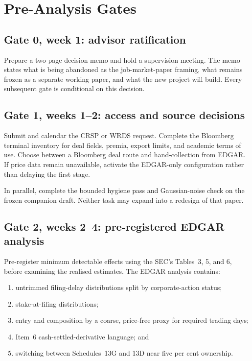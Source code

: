 \section{Pre-Analysis Gates}
\label{sec:plan-gates}

\subsection*{Gate 0, week 1: advisor ratification}

Prepare a two-page decision memo and hold a supervision meeting. The memo states
what is being abandoned as the job-market-paper framing, what remains frozen as
a separate working paper, and what the new project will build. Every subsequent
gate is conditional on this decision.

\subsection*{Gate 1, weeks 1--2: access and source decisions}

Submit and calendar the CRSP or WRDS request. Complete the Bloomberg terminal
inventory for deal fields, premia, export limits, and academic terms of use.
Choose between a Bloomberg deal route and hand-collection from EDGAR. If price
data remain unavailable, activate the EDGAR-only configuration rather than
delaying the first stage.

In parallel, complete the bounded hygiene pass and Gaussian-noise check on the
frozen companion draft. Neither task may expand into a redesign of that paper.

\subsection*{Gate 2, weeks 2--4: pre-registered EDGAR analysis}

Pre-register minimum detectable effects using the SEC's Tables~3, 5, and 6,
before examining the realised estimates. The EDGAR analysis contains:
\begin{enumerate}
\item untrimmed filing-delay distributions split by corporate-action status;
\item stake-at-filing distributions;
\item entry and composition by a coarse, price-free proxy for required trading
days;
\item Item~6 cash-settled-derivative language; and
\item switching between Schedules~13G and 13D near five per cent ownership.
\end{enumerate}

